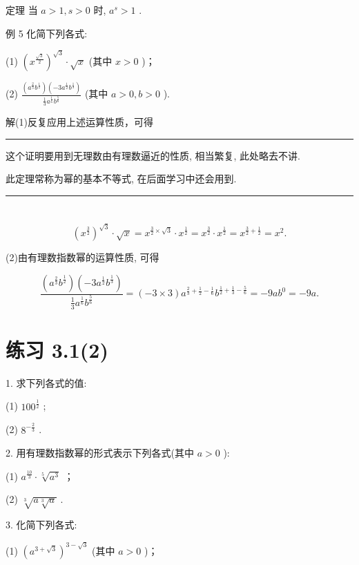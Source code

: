 \documentclass[10pt]{article}
\newcommand{\HRule}{\begin{center}\rule{0.9\linewidth}{0.2mm}\end{center}}
\begin{document}
定理 当 \(a > 1,s > 0\) 时, \({a}^{s} > 1\) .

例 5 化简下列各式:

(1) \({\left( {x}^{\frac{\sqrt{3}}{2}}\right) }^{\sqrt{3}} \cdot  \sqrt{x}\) (其中 \(x > 0\) )；

(2) \(\frac{\left( {{a}^{\frac{2}{3}}{b}^{\frac{1}{2}}}\right) \left( {-3{a}^{\frac{1}{2}}{b}^{\frac{1}{3}}}\right) }{\frac{1}{3}{a}^{\frac{1}{6}}{b}^{\frac{5}{6}}}\) (其中 \(a > 0,b > 0\) ).

解(1)反复应用上述运算性质，可得



\HRule

这个证明要用到无理数由有理数逼近的性质, 相当繁复, 此处略去不讲.

此定理常称为幂的基本不等式, 在后面学习中还会用到.

\HRule

\section*{}

\[
{\left( {x}^{\frac{3}{2}}\right) }^{\sqrt{3}} \cdot  \sqrt{x} = {x}^{\frac{3}{2} \times  \sqrt{3}} \cdot  {x}^{\frac{1}{2}} = {x}^{\frac{3}{2}} \cdot  {x}^{\frac{1}{2}} = {x}^{\frac{3}{2} + \frac{1}{2}} = {x}^{2}.
\]

(2)由有理数指数幂的运算性质, 可得

\[
\frac{\left( {{a}^{\frac{2}{3}}{b}^{\frac{1}{2}}}\right) \left( {-3{a}^{\frac{1}{2}}{b}^{\frac{1}{3}}}\right) }{\frac{1}{3}{a}^{\frac{1}{6}}{b}^{\frac{5}{6}}} = \left( {-3 \times  3}\right) {a}^{\frac{2}{3} + \frac{1}{2} - \frac{1}{6}}{b}^{\frac{1}{2} + \frac{1}{3} - \frac{5}{6}} =  - {9a}{b}^{0} =  - {9a}.
\]

\section*{练习 3.1(2)}

1. 求下列各式的值:

(1) \({100}^{\frac{1}{2}}\) ;

(2) \({8}^{-\frac{2}{3}}\) .

2. 用有理数指数幂的形式表示下列各式(其中 \(a > 0\) ):

(1) \({a}^{\frac{10}{3}} \cdot  \sqrt[5]{{a}^{3}}\) ；

(2) \(\sqrt[3]{a\sqrt[3]{a}}\) .

3. 化简下列各式:

(1) \({\left( {a}^{3 + \sqrt{3}}\right) }^{3 - \sqrt{3}}\) (其中 \(a > 0\) )；
\end{document}

